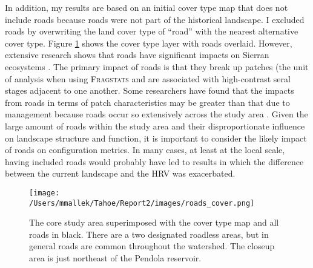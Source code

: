 In addition, my results are based on an initial cover type map that does not include roads because roads were not part of the historical landscape. I excluded roads by overwriting the land cover type of ``road'' with the nearest alternative cover type. Figure \ref{fig:roadcovermap} shows the cover type layer with roads overlaid. However, extensive research shows that roads have significant impacts on Sierran ecosystems \citep{Karr2004,Trombulak2000,Gucinski2001,Theobald2011}. The primary impact of roads is that they break up patches (the unit of analysis when using \textsc{Fragstats} and are associated with high-contrast seral stages adjacent to one another. Some researchers have found that the impacts from roads in terms of patch characteristics may be greater than that due to management because roads occur so extensively across the study area \citep{Gucinski2001,Tinker1998,Mcgarigal2001}. Given the large amount of roads within the study area and their disproportionate influence on landscape structure and function, it is important to consider the likely impact of roads on configuration metrics. In many cases, at least at the local scale, having included roads would probably have led to results in which the difference between the current landscape and the HRV was exacerbated.
%
\begin{figure}[!htbp]
  \centering
  \texttt{[image: /Users/mmallek/Tahoe/Report2/images/roads\_cover.png]}
  \caption{The core study area superimposed with the cover type map and all roads in black. There are a two designated roadless areas, but in general roads are common throughout the watershed. The closeup area is just northeast of the Pendola reservoir.} 
  \label{fig:roadcovermap}
\end{figure}
%



